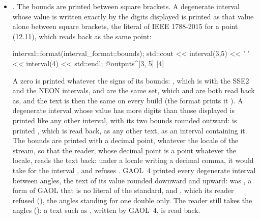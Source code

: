 \documentclass[12pt,a4paper,twoside,openright]{book}
\begin{document}
\begin{itemize}
\item[$\bullet$] . The bounds are printed between square
brackets. A degenerate interval whose value is written exactly by the
digits displayed is printed as that value alone between square brackets,
the literal of IEEE 1788-2015 for a point (12.11), which
 reads back as the same point:
\begin{example}
 interval::format(interval_format::bounds);
 std::cout << interval(3,5) << ' ' << interval(4) << std::endl;
 @outputs^[3, 5] [4]~
\end{example}
A zero is printed \code{[0]} whatever the signs of its bounds:
, which  is with the SSE2 and the NEON
intervals,  and  are the same set, which \code{[0]}
and \code{[-0]} are both read back as, and the text is then the same on
every build (the format  prints it \code{[0x0p+0]}). A
degenerate interval whose value has more digits than those displayed is
printed like any other interval, with its two bounds rounded outward:
 is printed \code{[0.1, 0.1000000000000001]}, which is
read back, as any other text, as an interval containing it. The bounds are
printed with a decimal point, whatever the locale of the stream, so that
the reader, whose decimal point is a point whatever the locale, reads the
text back: under a locale writing a decimal comma, it would take
\code{[-2,5]} for the interval , and refuses
\code{[0,5, 2,5]}.\newinvfive{} GAOL~4 printed every degenerate interval
between angles, the text of its value rounded downward and upward:
 was , a form of GAOL that is no literal of
the standard, and  ,
which its reader refused (), the angles
standing for one double only. The reader still takes the angles
(): a text such as , written by
GAOL~4, is read back.


\end{itemize}
\end{document}
